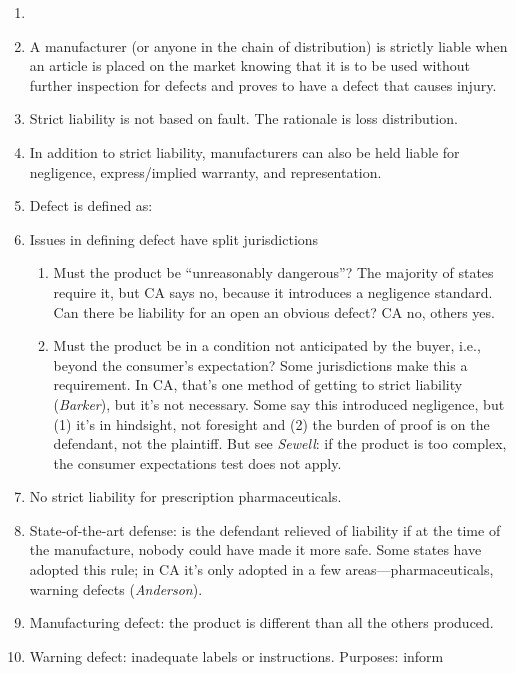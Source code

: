 \begin{enumerate}
    \item %
    \item A manufacturer (or anyone in the chain of distribution) is strictly 
    liable when an article is placed on the market knowing that it is to be used 
    without further inspection for defects and proves to have a defect that 
    causes injury.
    \item Strict liability is not based on fault. The rationale is loss 
    distribution. %
    \item In addition to strict liability, manufacturers can also be held liable 
    for negligence, express/implied warranty, and representation.
    \item Defect is defined as: %
    \item Issues in defining defect have split jurisdictions
    \begin{enumerate}
        \item Must the product be ``unreasonably dangerous''? The majority of 
        states require it, but CA says no, because it introduces a negligence 
        standard. Can there be liability for an open an obvious defect? CA no, 
        others yes.
        \item Must the product be in a condition not anticipated by the buyer, 
        i.e., beyond the consumer's expectation? Some jurisdictions make this a 
        requirement. In CA, that's one method of getting to strict liability 
        (\emph{Barker}), but it's not necessary. Some say this introduced 
        negligence, but (1) it's in hindsight, not foresight and (2) the burden 
        of proof is on the defendant, not the plaintiff. But see \emph{Sewell}: 
        if the product is too complex, the consumer expectations test does not 
        apply. %
    \end{enumerate}
    \item No strict liability for prescription pharmaceuticals.
    \item State-of-the-art defense: is the defendant relieved of liability if at 
    the time of the manufacture, nobody could have made it more safe. Some 
    states have adopted this rule; in CA it's only adopted in a few 
    areas---pharmaceuticals, warning defects (\emph{Anderson}).
    \item Manufacturing defect: the product is different than all the others 
    produced.
    \item Warning defect: inadequate labels or instructions. Purposes: inform 

\end{enumerate}
